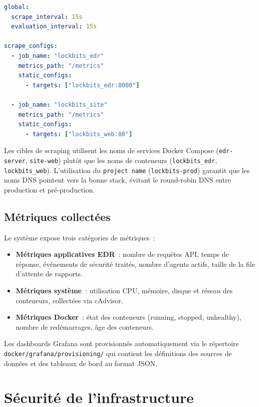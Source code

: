 \begin{lstlisting}[language=yaml, caption={Configuration Prometheus pour le scraping des services}, label={lst:prometheus-config}]
global:
  scrape_interval: 15s
  evaluation_interval: 15s

scrape_configs:
  - job_name: "lockbits_edr"
    metrics_path: "/metrics"
    static_configs:
      - targets: ["lockbits_edr:8000"]

  - job_name: "lockbits_site"
    metrics_path: "/metrics"
    static_configs:
      - targets: ["lockbits_web:80"]
\end{lstlisting}

Les cibles de scraping utilisent les noms de services Docker Compose
(\texttt{edr-server}, \texttt{site-web}) plutôt que les noms de conteneurs
(\texttt{lockbits\_edr}, \texttt{lockbits\_web}). L'utilisation du \texttt{project name}
(\texttt{lockbits-prod}) garantit que les noms DNS pointent vers la bonne stack,
évitant le round-robin DNS entre production et pré-production.

\subsection{Métriques collectées}

Le système expose trois catégories de métriques~:

\begin{itemize}
  \item \textbf{Métriques applicatives EDR}~: nombre de requêtes API, temps de
    réponse, événements de sécurité traités, nombre d'agents actifs, taille de
    la file d'attente de rapports.
  \item \textbf{Métriques système}~: utilisation CPU, mémoire, disque et réseau
    des conteneurs, collectées via cAdvisor.
  \item \textbf{Métriques Docker}~: état des conteneurs (running, stopped,
    unhealthy), nombre de redémarrages, âge des conteneurs.
\end{itemize}

Les dashboards Grafana sont provisionnés automatiquement via le répertoire
\texttt{docker/grafana/provisioning/} qui contient les définitions des sources
de données et des tableaux de bord au format JSON.

\section{Sécurité de l'infrastructure}


